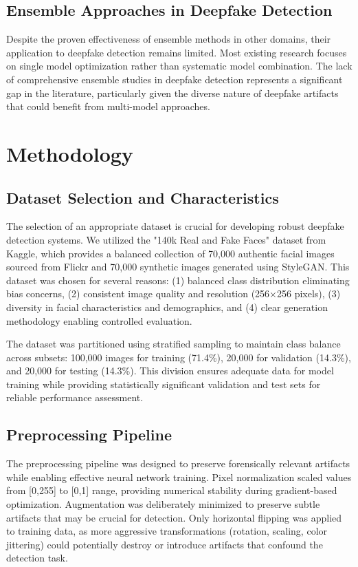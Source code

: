 \documentclass[conference]{IEEEtran}
\begin{document}
\subsection{Ensemble Approaches in Deepfake Detection}

Despite the proven effectiveness of ensemble methods in other domains, their application to deepfake detection remains limited. Most existing research focuses on single model optimization rather than systematic model combination. The lack of comprehensive ensemble studies in deepfake detection represents a significant gap in the literature, particularly given the diverse nature of deepfake artifacts that could benefit from multi-model approaches.

\section{Methodology}

\subsection{Dataset Selection and Characteristics}

The selection of an appropriate dataset is crucial for developing robust deepfake detection systems. We utilized the "140k Real and Fake Faces" dataset from Kaggle, which provides a balanced collection of 70,000 authentic facial images sourced from Flickr and 70,000 synthetic images generated using StyleGAN. This dataset was chosen for several reasons: (1) balanced class distribution eliminating bias concerns, (2) consistent image quality and resolution (256×256 pixels), (3) diversity in facial characteristics and demographics, and (4) clear generation methodology enabling controlled evaluation.

The dataset was partitioned using stratified sampling to maintain class balance across subsets: 100,000 images for training (71.4\%), 20,000 for validation (14.3\%), and 20,000 for testing (14.3\%). This division ensures adequate data for model training while providing statistically significant validation and test sets for reliable performance assessment.

\subsection{Preprocessing Pipeline}

The preprocessing pipeline was designed to preserve forensically relevant artifacts while enabling effective neural network training. Pixel normalization scaled values from [0,255] to [0,1] range, providing numerical stability during gradient-based optimization. Augmentation was deliberately minimized to preserve subtle artifacts that may be crucial for detection. Only horizontal flipping was applied to training data, as more aggressive transformations (rotation, scaling, color jittering) could potentially destroy or introduce artifacts that confound the detection task.
\end{document}
